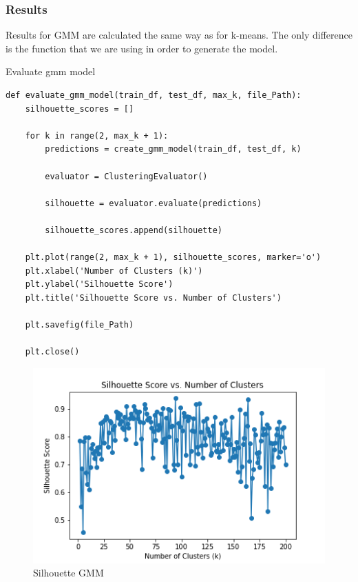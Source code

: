 \subsubsection{Results}

Results for GMM are calculated the same way as for k-means. The only difference is the function that we are using in order to generate the model.
\begin{listing}[H]
\caption{Evaluate gmm model}
\begin{verbatim}
def evaluate_gmm_model(train_df, test_df, max_k, file_Path):
    silhouette_scores = []

    for k in range(2, max_k + 1):
        predictions = create_gmm_model(train_df, test_df, k)

        evaluator = ClusteringEvaluator()

        silhouette = evaluator.evaluate(predictions)

        silhouette_scores.append(silhouette)

    plt.plot(range(2, max_k + 1), silhouette_scores, marker='o')
    plt.xlabel('Number of Clusters (k)')
    plt.ylabel('Silhouette Score')
    plt.title('Silhouette Score vs. Number of Clusters')

    plt.savefig(file_Path)

    plt.close()
\end{verbatim}
\end{listing}

\begin{figure}[H]
\includegraphics[scale=0.85]{img/Model/Clustering/gmm.png}
\centering
\caption{Silhouette GMM}
\label{fig:SVM_confusion_matrix}
\end{figure}